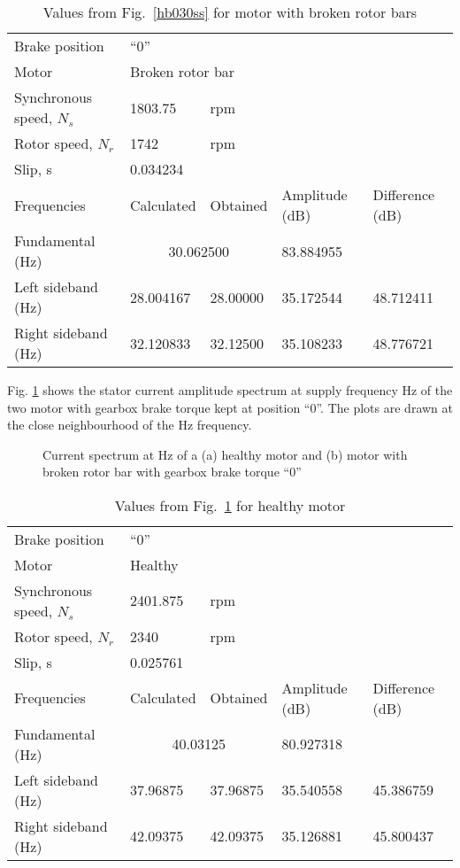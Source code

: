 \documentclass[a4paper,11pt]{report}
\begin{document}
\begin{table}[h]
\centering
\begin{tabular}{lllll}
Brake position	& ``0'' & & & \\			
Motor &	\multicolumn{4}{l}{Broken rotor	bar} \\ 
Synchronous speed, $N_{s}$	& 1803.75 & rpm & & \\			 
Rotor speed, $N_{r}$ & 1742	& rpm& & \\		
Slip, s	& \multicolumn{4}{l}{0.034234} \\			
Frequencies & Calculated & Obtained & Amplitude (dB) & Difference (dB) \\
Fundamental (Hz)& \multicolumn{2}{c}{30.062500}	&83.884955 &  \\ 
Left sideband (Hz) & 28.004167 &28.00000  & 35.172544 & 48.712411 \\
Right sideband (Hz)& 32.120833 & 32.12500 & 35.108233 & 48.776721 
\end{tabular}
\caption{Values from Fig.~\ref{hb030ss} for motor with broken rotor bars}\label{b030sst}
\end{table}

\clearpage
Fig. \ref{hb040ss} shows the stator current amplitude spectrum at supply frequency \unit[40]{Hz} of the two motor with gearbox brake torque kept at position ``0''. The plots are drawn at the close neighbourhood of the \unit[40]{Hz} frequency.

\begin{figure}[htbp]
\centering
\subfigure[]{\texttt{[image: h040]}}
\subfigure[]{\texttt{[image: b040]}}
\caption{Current spectrum at \unit[40]{Hz} of a (a) healthy motor and (b) motor with broken rotor bar with gearbox brake torque ``0''} \label{hb040ss}
\end{figure}

\begin{table}[h]
\centering
\begin{tabular}{lllll}
Brake position	& ``0'' & & & \\			
Motor &	\multicolumn{4}{l}{Healthy} \\ 
Synchronous speed, $N_{s}$	& 2401.875& rpm & & \\			
Rotor speed, $N_{r}$ 	  	& 2340	& rpm& & \\		
Slip, s			  	& \multicolumn{4}{l}{0.025761} \\			
Frequencies 		  	& Calculated & Obtained & Amplitude (dB) & Difference (dB) \\
Fundamental (Hz)		& \multicolumn{2}{c}{40.03125}	& 80.927318	&  \\ 
Left sideband (Hz) 		& 37.96875 & 37.96875 & 35.540558 & 45.386759 \\
Right sideband (Hz)		& 42.09375 & 42.09375 & 35.126881 & 45.800437 
\end{tabular}
\caption{Values from Fig.~\ref{hb040ss} for healthy motor}\label{h040sst}
\end{table}
\end{document}
